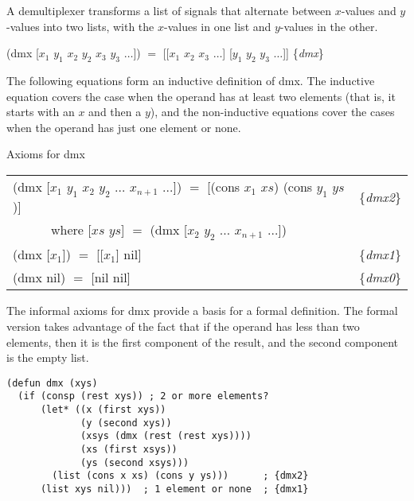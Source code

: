 A demultiplexer transforms a list of signals that alternate between
$x$-values and $y$-values into two lists,
with the $x$-values in one list and $y$-values in the other.

\hspace{1cm} \textsf{(dmx [$x_1$ $y_1$ $x_2$ $y_2$ $x_3$ $y_3$ $\dots$]) $=$
[[$x_1$ $x_2$ $x_3$ $\dots$] [$y_1$ $y_2$ $y_3$ $\dots$]]}
\hfill \{\emph{dmx}\}

The following equations form an inductive definition of dmx.
The inductive equation covers the case when
the operand has at least two elements
(that is, it starts with an $x$ and then a $y$),
and the non-inductive equations cover the cases
when the operand has just one element or none.

\begin{center}
Axioms for \textsf{dmx}
\begin{tabular}{ll}
\textsf{(dmx [$x_1$ $y_1$ $x_2$ $y_2$ $\dots$ $x_{n+1}$ $\dots$])} $=$ \textsf{[(cons $x_1$ $xs$) (cons $y_1$ $ys$)] }&\{\emph{dmx2}\} \\
~~~~~~where \textsf{[$xs$ $ys$]} $=$ \textsf{(dmx [$x_2$ $y_2$ $\dots$ $x_{n+1}$ $\dots$])}       &\\
\textsf{(dmx [$x_1$]) $=$  [[$x_1$] nil]}                                                         &\{\emph{dmx1}\} \\
\textsf{(dmx nil) $=$ [nil nil] }                                                                 &\{\emph{dmx0}\} \\
\end{tabular}
\end{center}

The informal axioms for \textsf{dmx} provide a basis for a formal definition.
The formal version takes advantage of the fact that if the operand
has less than two elements, then it is the first component of the result,
and the second component is the empty list.

\label{dmx-defun}
\begin{Verbatim}
(defun dmx (xys)
  (if (consp (rest xys)) ; 2 or more elements?
      (let* ((x (first xys))
             (y (second xys))
             (xsys (dmx (rest (rest xys))))
             (xs (first xsys))
             (ys (second xsys)))
        (list (cons x xs) (cons y ys)))      ; {dmx2}
      (list xys nil)))  ; 1 element or none  ; {dmx1}
\end{Verbatim}

